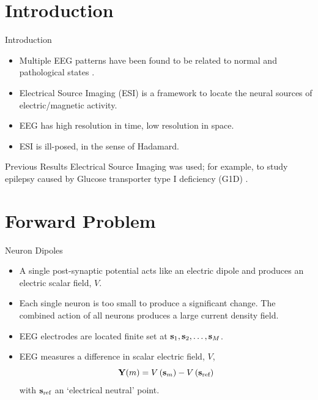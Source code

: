 \documentclass[progressbar=head]{beamer}
\begin{document}
{
\section{Introduction}
}

\begin{frame}{Introduction}
\begin{itemize}
\item Multiple EEG patterns have been found to be related to normal and pathological states . 
\item Electrical Source Imaging (ESI) is a framework to locate the neural sources of electric/magnetic activity.
\item EEG has high resolution in time, low resolution in space. 
\item ESI is ill-posed, in the sense of Hadamard.
\end{itemize}
\end{frame}




\begin{frame}{Previous Results}
Electrical Source Imaging was used; for example, 
to study epilepsy caused by Glucose transporter type I deficiency (G1D) .
\end{frame}

{
\section{Forward Problem}
}

\begin{frame}{Neuron Dipoles}
\begin{itemize}
\item A single post-synaptic potential 
acts like an electric dipole and
produces an electric scalar field, $V$. 
\item Each single neuron is too small to produce a significant change. The combined action of all neurons produces a large current density field.
\item EEG electrodes are located finite set at $\mathbf{s}_1, \mathbf{s}_2, \dots, \mathbf{s}_M$.
\item EEG measures a difference in scalar electric field, $V$,
\begin{equation}
\mathbf{Y}(m) = V\left( \mathbf{s}_m \right) - V\left( \mathbf{s}_\text{ref} \right)
\end{equation}
with $\mathbf{s}_\text{ref}$ an `electrical neutral' point.
\end{itemize}
\end{frame}
\end{document}
